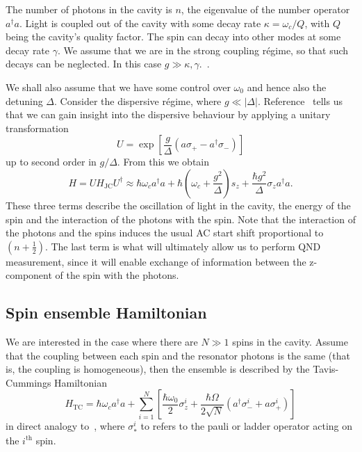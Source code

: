The number of photons in the cavity is $n$, the eigenvalue of the number
operator $a^\dagger a$.  Light is coupled out of the cavity with some decay
rate $\kappa = \omega_c/Q$, with $Q$ being the cavity's quality factor. The
spin can decay into other modes at some decay rate $\gamma$. We assume that we
are in the strong coupling r\'egime, so that such decays can be neglected. In
this case $g \gg \kappa, \gamma$.~\cite{PhysRevA.69.062320}.

We shall also assume that we have some control over $\omega_0$ and hence also
the detuning $\Delta$. Consider the dispersive r\'egime, where  $g\ll|\Delta|$.
Reference~\cite{PhysRevA.69.062320} tells us that we can gain insight into the
dispersive behaviour by applying  a unitary transformation
%
\begin{equation} U = \exp \left[\frac{g}{\Delta}(a\sigma_+ -
a^\dagger\sigma_-)\right] \end{equation}
%
up to second order in $g/\Delta$. From this we obtain
%
\begin{equation} H= UH_\text{JC}U^\dagger \approx \hbar \omega_c
  a^\dagger a + \hbar\left(\omega_c +
  \frac{g^2}{\Delta}\right)s_z + \frac{\hbar
  g^2}{\Delta}\sigma_z a^\dagger a.  \end{equation}
%
These three terms describe the oscillation of light in the cavity, the energy
of the spin and the interaction of the photons with the spin. Note that the
interaction of the photons and the spins induces the usual AC start shift
proportional to $(n+\frac{1}{2})$. The last term is what will ultimately allow
us to perform QND measurement, since it will enable exchange of information
between the z-component of the spin with the photons.

\subsection{Spin ensemble Hamiltonian}

We are interested in the case where there are $N\gg1$ spins in the
cavity. Assume that the coupling between each spin and the resonator photons is
the same (that is, the coupling is homogeneous), then the ensemble is described
by the Tavis-Cummings Hamiltonian~\cite{Kirton2019}
%
\begin{equation}
  H_\text{TC}=  \hbar \omega_c a^\dagger a + \sum_{i=1}^N\left[
    \frac{\hbar\omega_0}{2}\sigma_z^i +\frac{\hbar\Omega}{2\sqrt{N}}(a^\dagger
    \sigma^i_- + a\sigma^i_+)\right]
\end{equation}
%
in direct analogy to~, where $\sigma_*^i$ to refers
to the pauli or ladder operator acting on the $i^\text{th}$ spin.

